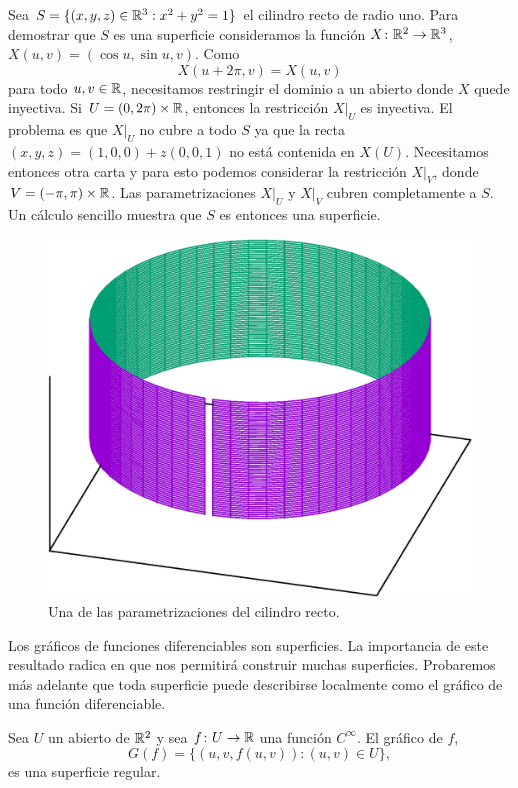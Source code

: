 \begin{example}
	\label{exa:cilindro_recto}
	Sea $S=\{(x,y,z)\in\mathbb{R}^3:x^2+y^2=1\}$ el cilindro recto de radio uno. Para
	demostrar que $S$ es una superficie consideramos la función
	$X\colon\mathbb{R}^2\to\mathbb{R}^3$, $X(u,v)=(\cos u,\sin u,v)$. Como
	\[
		X(u+2\pi,v)=X(u,v)
	\]
	para todo $u,v\in\mathbb{R}$, necesitamos restringir el dominio a un abierto donde
	$X$ quede inyectiva. Si $U=(0,2\pi)\times\mathbb{R}$, entonces la restricción
	$X|_U$ es inyectiva. El problema es que $X|_U$ no cubre a todo $S$ ya que
	la recta $(x,y,z)=(1,0,0)+z(0,0,1)$ no está contenida en $X(U)$. Necesitamos
	entonces otra carta y para esto podemos considerar la restricción $X|_V$, donde
	$V=(-\pi,\pi)\times\mathbb{R}$. Las parametrizaciones $X|_U$ y $X|_V$ cubren
	completamente a $S$. Un cálculo sencillo muestra que $S$ es entonces una
	superficie.
	\begin{figure}
		\centering
    	\includegraphics[scale=0.3]{eps/cilindro}
		\caption{Una de las parametrizaciones del cilindro recto.}
		\label{fig:cilindro}
	\end{figure}
\end{example}

Los gráficos de funciones diferenciables son superficies. La importancia de
este resultado radica en que nos permitirá construir muchas superficies.
Probaremos más adelante que toda superficie puede describirse localmente como
el gráfico de una función diferenciable. 

\begin{proposition}
	Sea $U$ un abierto de $\mathbb{R}^2$ y sea $f\colon U\to\mathbb{R}$ una función
	$C^{\infty}$. El gráfico de $f$,
	\[
		G(f)=\{(u,v,f(u,v)):(u,v)\in U\}, 
	\]
	es una superficie regular.
\end{proposition}

